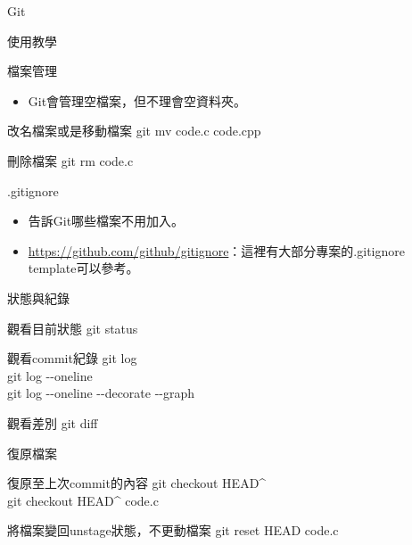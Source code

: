 \documentclass[pdf,16pt]{beamer}
\begin{document}
\begin{section}{Git}
\begin{subsection}{使用教學}
      \begin{frame}{檔案管理}
        \begin{itemize}
          \item Git會管理空檔案，但不理會空資料夾。
        \end{itemize}
        \begin{block}{改名檔案或是移動檔案}
          git mv code.c code.cpp
        \end{block}
        \begin{block}{刪除檔案}
          git rm code.c
        \end{block}
      \end{frame}
      
      \begin{frame}{.gitignore}
        \begin{itemize}
          \item 告訴Git哪些檔案不用加入。
          \item \url{https://github.com/github/gitignore}：這裡有大部分專案的.gitignore template可以參考。
        \end{itemize}
      \end{frame}
      
      \begin{frame}{狀態與紀錄}
        \begin{block}{觀看目前狀態}
          git status
        \end{block}
        \begin{block}{觀看commit紀錄}
          git log\\
          git log -\phantom{}-oneline\\
          git log -\phantom{}-oneline -\phantom{}-decorate -\phantom{}-graph
        \end{block}
        \begin{block}{觀看差別}
          git diff
        \end{block}
      \end{frame}
      
      \begin{frame}{復原檔案}
        \begin{block}{復原至上次commit的內容}
          git checkout HEAD\textasciicircum\\
          git checkout HEAD\textasciicircum\phantom{} code.c
        \end{block}
        \begin{block}{將檔案變回unstage狀態，不更動檔案}
          git reset HEAD code.c
        \end{block}
      \end{frame}
      

\end{subsection}
\end{section}
\end{document}
